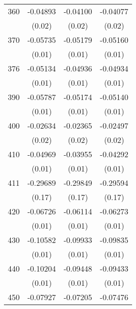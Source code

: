 \begin{table}[htbp]
\begin{tabular}{l*{3}{c}}
360                 &    -0.04893\sym{**} &    -0.04100\sym{*}  &    -0.04077\sym{*}  \\
                    &      (0.02)         &      (0.02)         &      (0.02)         \\
370                 &    -0.05735\sym{***}&    -0.05179\sym{***}&    -0.05160\sym{***}\\
                    &      (0.01)         &      (0.01)         &      (0.01)         \\
376                 &    -0.05134\sym{***}&    -0.04936\sym{***}&    -0.04934\sym{***}\\
                    &      (0.01)         &      (0.01)         &      (0.01)         \\
390                 &    -0.05787\sym{***}&    -0.05174\sym{***}&    -0.05140\sym{***}\\
                    &      (0.01)         &      (0.01)         &      (0.01)         \\
400                 &    -0.02634         &    -0.02365         &    -0.02497         \\
                    &      (0.02)         &      (0.02)         &      (0.02)         \\
410                 &    -0.04969\sym{***}&    -0.03955\sym{***}&    -0.04292\sym{***}\\
                    &      (0.01)         &      (0.01)         &      (0.01)         \\
411                 &    -0.29689         &    -0.29849         &    -0.29594         \\
                    &      (0.17)         &      (0.17)         &      (0.17)         \\
420                 &    -0.06726\sym{***}&    -0.06114\sym{***}&    -0.06273\sym{***}\\
                    &      (0.01)         &      (0.01)         &      (0.01)         \\
430                 &    -0.10582\sym{***}&    -0.09933\sym{***}&    -0.09835\sym{***}\\
                    &      (0.01)         &      (0.01)         &      (0.01)         \\
440                 &    -0.10204\sym{***}&    -0.09448\sym{***}&    -0.09433\sym{***}\\
                    &      (0.01)         &      (0.01)         &      (0.01)         \\
450                 &    -0.07927\sym{***}&    -0.07205\sym{***}&    -0.07476\sym{***}\\

\end{tabular}
\end{table}
